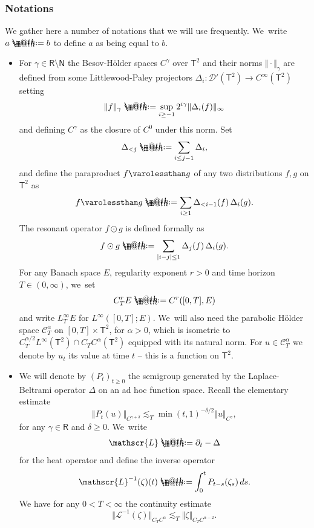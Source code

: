 \documentclass[JEP,XML,SOM,Unicode,published]{cedram}
\makeatletter
\theoremstyle{definition}
\newcommand\bbN{\mathbf{\mathsf{N}}}
\newcommand\bbR{\mathbf{\mathsf{R}}}
\newcommand{\bsfT}{\mathbf{\mathsf{T}}}
\newcommand{\mcD}{\mathcal{D}}
\newcommand{\scrC}{\ensuremath{\mathscr{C}}}
\newcommand*{\defeq}{\mathrel{\rlap{%
\raisebox{0.3ex}{$\m@th\cdot$}}%
\raisebox{-0.3ex}{$\m@th\cdot$}}%
=}
\newcommand{\norme}[1]{\Vert #1 \Vert}
\newcommand{\scrL}{\mathscr{L}}
\makeatother
\begin{document}
\subsubsection*{Notations} We gather here a number of notations that we will use frequently. We~write $a \defeq b$ to define $a$ as being equal to $b$.
\begin{itemize}
\item
For $\gamma\in\bbR\setminus\bbN$ the Besov-Hölder spaces $C^\gamma$ over $\bsfT^2$ and their norms $\Vert{\cdot}\Vert_\gamma$ are defined from some Littlewood-Paley projectors $\Delta_i : \mcD'(\bsfT^2)\to C^\infty(\bsfT^2)$ setting
\[
\Vert f\Vert_\gamma \defeq \sup_{i\geq -1} 2^{i\gamma} \Vert \Delta_i(f)\Vert_\infty
\]
and defining $C^\gamma$ as the closure of $C^0$ under this norm. Set
\[
\Delta_{<j} \defeq \sum_{i\leq j-1}\Delta_i,
\]
and define the paraproduct $f\varolessthan g$ of any two distributions $f,g$ on $\bsfT^2$ as
\begin{equation} \label{EqParaproduit}
f \varolessthan g \defeq \sum_{i\geq 1} \Delta_{<i-1}(f)\,\Delta_i(g).
\end{equation}
The resonant operator $f\odot g$ is defined formally as
\begin{equation} \label{EqResonance}
f\odot g \defeq \sum_{\vert i-j\vert\leq 1} \Delta_j(f)\,\Delta_i(g).
\end{equation}
For any Banach space $E$, regularity exponent $r>0$ and time horizon $T\in(0,\infty)$, we~set
\[
C_T^r E \defeq C^r([0,T],E)
\]
and write $L^\infty_TE$ for $L^\infty([0,T];E)$. We~will also need the parabolic Hölder space $\scrC^\alpha_T$ on $[0,T]\times\bsfT^2$, for $\alpha>0$, which is isometric to $C^{\alpha/2}_TL^\infty(\bsfT^2) \cap C_T C^\alpha(\bsfT^2)$ equipped with its natural norm. For $u \in \scrC^\alpha_T$ we denote by $u_t$ its value at time $t$ -- this is a function on $\bsfT^2$.

\item
We will denote by $(P_t)_{t \geq 0}$ the semigroup generated by the Laplace-Beltrami operator $\Delta$ on an ad hoc function space. Recall the elementary estimate
\begin{equation} \label{EqHeatEstimate}
\norme{P_t(u)}_{C^{\gamma+\delta}}\lesssim_T \min(t,1)^{-\delta/2}\norme{u}_{C^\gamma},
\end{equation}
for any $\gamma\in\bbR$ and $\delta\geq 0$. We~write
\[
\mathscr{L} \defeq \partial_t-\Delta
\]
for the heat operator and define the inverse operator
\[
\mathscr{L}^{-1}(\zeta)(t) \defeq \int_0^t P_{t-s}(\zeta_s) \, ds.
\]
We have for any $0<T<\infty$ the continuity estimate
\begin{equation} \label{EqBoundIntegration}
\Vert \scrL^{-1}(\zeta)\Vert_{C_TC^\alpha} \lesssim_T \Vert \zeta\Vert_{C_T C^{\alpha-2}}.
\end{equation}


\end{itemize}
\end{document}
